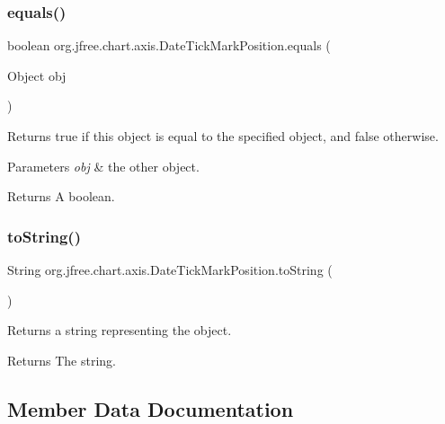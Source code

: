 \subsubsection{\texorpdfstring{equals()}{equals()}}
{\footnotesize\ttfamily boolean org.\+jfree.\+chart.\+axis.\+Date\+Tick\+Mark\+Position.\+equals (\begin{DoxyParamCaption}\item[{Object}]{obj }\end{DoxyParamCaption})}

Returns {\ttfamily true} if this object is equal to the specified object, and {\ttfamily false} otherwise.


\begin{DoxyParams}{Parameters}
{\em obj} & the other object.\\
\hline
\end{DoxyParams}
\begin{DoxyReturn}{Returns}
A boolean. 
\end{DoxyReturn}
\mbox{\label{classorg_1_1jfree_1_1chart_1_1axis_1_1_date_tick_mark_position_a3ac880ef58ee8037c9ad507589a8e79e}} 
\subsubsection{\texorpdfstring{to\+String()}{toString()}}
{\footnotesize\ttfamily String org.\+jfree.\+chart.\+axis.\+Date\+Tick\+Mark\+Position.\+to\+String (\begin{DoxyParamCaption}{ }\end{DoxyParamCaption})}

Returns a string representing the object.

\begin{DoxyReturn}{Returns}
The string. 
\end{DoxyReturn}


\subsection{Member Data Documentation}
\mbox{\label{classorg_1_1jfree_1_1chart_1_1axis_1_1_date_tick_mark_position_ae74a4131448457927e90d88bc82c7631}} 
